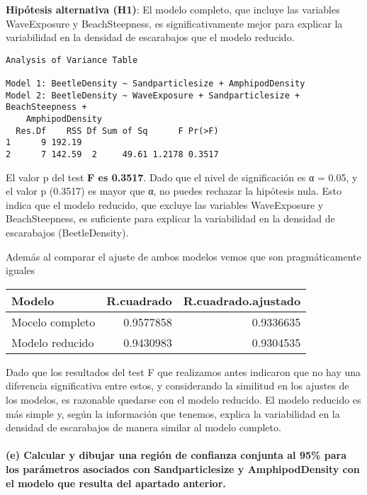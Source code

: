 \documentclass[
]{article}
\begin{document}
\textbf{Hipótesis alternativa (H1)}: El modelo completo, que incluye las
variables WaveExposure y BeachSteepness, es significativamente mejor
para explicar la variabilidad en la densidad de escarabajos que el
modelo reducido.

\begin{verbatim}
Analysis of Variance Table

Model 1: BeetleDensity ~ Sandparticlesize + AmphipodDensity
Model 2: BeetleDensity ~ WaveExposure + Sandparticlesize + BeachSteepness + 
    AmphipodDensity
  Res.Df    RSS Df Sum of Sq      F Pr(>F)
1      9 192.19                           
2      7 142.59  2     49.61 1.2178 0.3517
\end{verbatim}

El valor p del test \textbf{F es 0.3517}. Dado que el nivel de
significación es α = 0.05, y el valor p (0.3517) es mayor que α, no
puedes rechazar la hipótesis nula. Esto indica que el modelo reducido,
que excluye las variables WaveExposure y BeachSteepness, es suficiente
para explicar la variabilidad en la densidad de escarabajos
(BeetleDensity).

Además al comparar el ajuste de ambos modelos vemos que son
pragmáticamente iguales

\begin{longtable}[]{@{}lrr@{}}
\toprule\noalign{}
Modelo & R.cuadrado & R.cuadrado.ajustado \\
\midrule\noalign{}
\endhead
\bottomrule\noalign{}
\endlastfoot
Mocelo completo & 0.9577858 & 0.9336635 \\
Modelo reducido & 0.9430983 & 0.9304535 \\
\end{longtable}

Dado que los resultados del test F que realizamos antes indicaron que no
hay una diferencia significativa entre estos, y considerando la
similitud en los ajustes de los modelos, es razonable quedarse con el
modelo reducido. El modelo reducido es más simple y, según la
información que tenemos, explica la variabilidad en la densidad de
escarabajos de manera similar al modelo completo.

\hypertarget{e-calcular-y-dibujar-una-regiuxf3n-de-confianza-conjunta-al-95-para-los-paruxe1metros-asociados-con-sandparticlesize-y-amphipoddensity-con-el-modelo-que-resulta-del-apartado-anterior.}{%
\paragraph{\texorpdfstring{\textbf{(e) Calcular y dibujar una región de
confianza conjunta al 95\% para los parámetros asociados con
Sandparticlesize y AmphipodDensity con el modelo que resulta del
apartado
anterior}.}{(e) Calcular y dibujar una región de confianza conjunta al 95\% para los parámetros asociados con Sandparticlesize y AmphipodDensity con el modelo que resulta del apartado anterior.}}\label{e-calcular-y-dibujar-una-regiuxf3n-de-confianza-conjunta-al-95-para-los-paruxe1metros-asociados-con-sandparticlesize-y-amphipoddensity-con-el-modelo-que-resulta-del-apartado-anterior.}}
\end{document}
